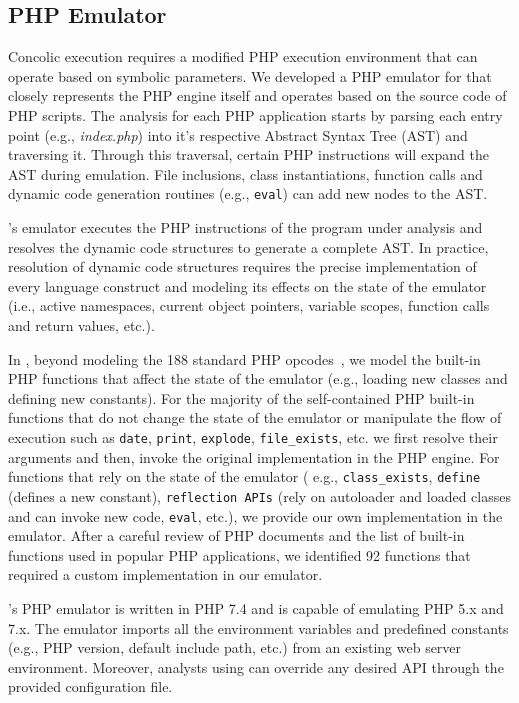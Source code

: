 \subsection{PHP Emulator}
Concolic execution requires a modified PHP execution environment that can operate based on symbolic parameters. 
We developed a PHP emulator for \animatedead{} that closely represents the PHP engine itself and operates based on the source code of PHP scripts. 
The analysis for each PHP application starts by parsing each entry point (e.g., \emph{index.php}) into it's respective Abstract Syntax Tree (AST) and traversing it. 
Through this traversal, certain PHP instructions will expand the AST during emulation. 
File inclusions, class instantiations, function calls and dynamic code generation routines (e.g., \texttt{eval}) can add new nodes to the AST. 

\animatedead{}'s emulator executes the PHP instructions of the program under analysis and resolves the dynamic code structures to generate a complete AST. 
In practice, resolution of dynamic code structures requires the precise implementation of every language construct and modeling its effects on the state of the emulator (i.e., active namespaces, current object pointers, variable scopes, function calls and return values, etc.). 

In \animatedead{}, beyond modeling the 188 standard PHP opcodes~\cite{popov}, we model the built-in PHP functions that affect the state of the emulator (e.g., loading new classes and defining new constants). 
For the majority of the self-contained PHP built-in functions that do not change the state of the emulator or manipulate the flow of execution such as \texttt{date}, \texttt{print}, \texttt{explode}, \texttt{file\_exists}, etc. we first resolve their arguments and then, invoke the original implementation in the PHP engine. 
For functions that rely on the state of the emulator ( e.g., \texttt{class\_exists}, \texttt{define} (defines a new constant), \texttt{reflection APIs} (rely on autoloader and loaded classes and can invoke new code, \texttt{eval}, etc.), we provide our own implementation in the emulator. 
After a careful review of PHP documents and the list of built-in functions used in popular PHP applications, we identified 92 functions that required a custom implementation in our emulator. 

\animatedead{}'s PHP emulator is written in PHP 7.4 and is capable of emulating PHP 5.x and 7.x. 
The emulator imports all the environment variables and predefined constants (e.g., PHP version, default include path, etc.) from an existing web server environment. 
Moreover, analysts using \animatedead{} can override any desired API through the provided configuration file. 

